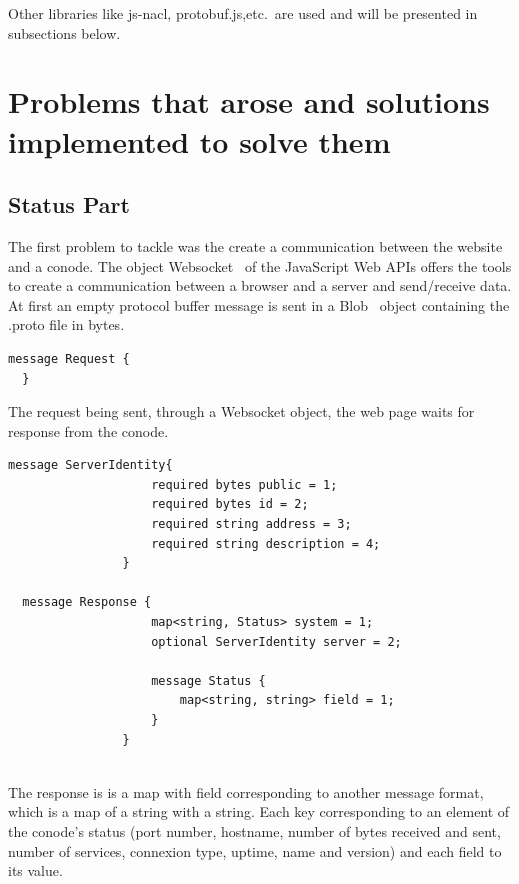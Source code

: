 \documentclass[11pt, a4paper, twoside, openright, openany]{book} %
\begin{document}
Other libraries like js-nacl, protobuf.js,etc.\ are used and will be presented
in subsections below.\\

\chapter{Problems that arose and solutions implemented to solve them}
\section{Status Part}
The first problem to tackle was the create a communication between the website
and a conode.
\newline
The object Websocket~\cite{websocketPage} of the JavaScript Web APIs offers the tools to create a communication
between a browser and a server and send/receive data.
\newline
At first an empty protocol buffer message is sent in a Blob~\cite{blob} object containing
the .proto file in bytes.\\

\begin{lstlisting}[caption={Empty protocol buffer message}, captionpos=b]
  message Request {
  }
\end{lstlisting}

The request being sent, through a Websocket object, the web page waits for response from the conode.\\

\begin{lstlisting}[caption={response protocol buffer message}, captionpos=b]
  message ServerIdentity{
    				required bytes public = 1;
    				required bytes id = 2;
    				required string address = 3;
    				required string description = 4;
				}

  message Response {
    				map<string, Status> system = 1;
    				optional ServerIdentity server = 2;

				    message Status {
        				map<string, string> field = 1;
    				}
				}
\end{lstlisting}
\leavevmode \\

The response is is a map with field corresponding to another message format, which
is a map of a string with a string. Each key corresponding to an element of the conode's
status (port number, hostname, number of bytes received and sent, number of services,
 connexion type, uptime, name and version) and each field to its value.\\
\end{document}
